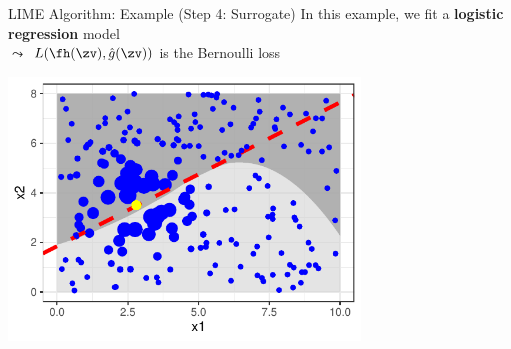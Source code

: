 \documentclass[11pt,compress,t,notes=noshow, aspectratio=169, xcolor=table]{beamer}
\newcommand{\gh}{\hat{g}}
\begin{document}
\begin{frame}{LIME Algorithm: Example (Step 4: Surrogate)}
		In this example, we fit a \textbf{logistic regression} model\\
        $\leadsto$ $L(\fh(\zv), \gh(\zv))$ is the Bernoulli loss
		\begin{center}
			\includegraphics[width=0.7\textwidth]{figure/lime5}
		\end{center}
\end{frame}

\endlecture
\end{document}
